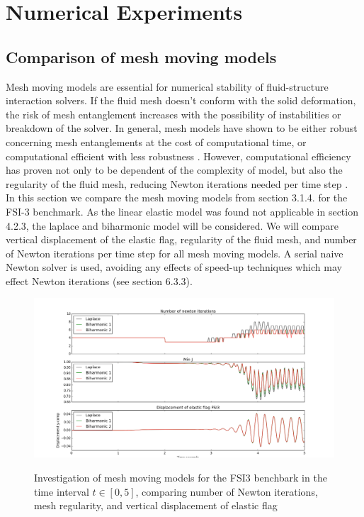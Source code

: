

 \chapter{Numerical Experiments}

\section{Comparison of mesh moving models}
Mesh moving models are essential for numerical stability of fluid-structure interaction solvers. If the fluid mesh doesn't conform with the solid deformation, the risk of mesh entanglement increases with the possibility of instabilities or breakdown of the solver. In general, mesh models have shown to be either robust concerning mesh entanglements at the cost of computational time, or computational efficient with less robustness \cite{MM2016}. However, computational efficiency has proven not only to be dependent of the complexity of model, but also the regularity of the fluid mesh, reducing Newton iterations needed per time step \cite{Wickb}. \\ In this section we compare the mesh moving models from section 3.1.4. for the FSI-3 benchmark. As the linear elastic model was found not applicable in section 4.2.3, the laplace and biharmonic model will be considered. 
We will compare vertical displacement of the elastic flag, regularity of the fluid mesh, and number of Newton iterations per time step for all mesh moving models. A serial naive Newton solver is used, avoiding any effects of speed-up techniques which may effect Newton iterations (see section 6.3.3). 

\newpage
\begin{figure}[h!]
 	\centering
    \includegraphics[scale=0.4]{./Fig/minjcompare.png} \\
      \caption{Investigation of mesh moving models for the FSI3 benchbark in the time interval $t \in [0, 5]$, comparing number of Newton iterations, mesh regularity, and vertical displacement of elastic flag }
      \label{fig:minjcomp}
\end{figure}

